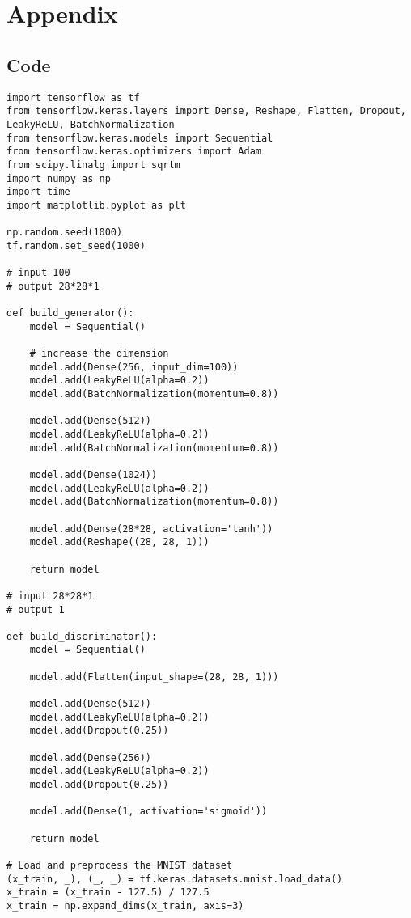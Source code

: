 \chapter{Appendix}
\label{Code}
\section*{Code}

\begin{lstlisting}[style=mypython, caption=GAN Model with Dense Layers]
import tensorflow as tf
from tensorflow.keras.layers import Dense, Reshape, Flatten, Dropout, LeakyReLU, BatchNormalization
from tensorflow.keras.models import Sequential
from tensorflow.keras.optimizers import Adam
from scipy.linalg import sqrtm
import numpy as np
import time
import matplotlib.pyplot as plt

np.random.seed(1000)
tf.random.set_seed(1000)

# input 100
# output 28*28*1

def build_generator():
    model = Sequential()
    
    # increase the dimension
    model.add(Dense(256, input_dim=100))
    model.add(LeakyReLU(alpha=0.2))
    model.add(BatchNormalization(momentum=0.8))
    
    model.add(Dense(512))
    model.add(LeakyReLU(alpha=0.2))
    model.add(BatchNormalization(momentum=0.8))
    
    model.add(Dense(1024))
    model.add(LeakyReLU(alpha=0.2))
    model.add(BatchNormalization(momentum=0.8))
    
    model.add(Dense(28*28, activation='tanh'))
    model.add(Reshape((28, 28, 1)))

    return model

# input 28*28*1
# output 1

def build_discriminator():
    model = Sequential()
    
    model.add(Flatten(input_shape=(28, 28, 1)))
    
    model.add(Dense(512))
    model.add(LeakyReLU(alpha=0.2))
    model.add(Dropout(0.25))
    
    model.add(Dense(256))
    model.add(LeakyReLU(alpha=0.2))
    model.add(Dropout(0.25))
    
    model.add(Dense(1, activation='sigmoid'))

    return model

# Load and preprocess the MNIST dataset
(x_train, _), (_, _) = tf.keras.datasets.mnist.load_data()
x_train = (x_train - 127.5) / 127.5
x_train = np.expand_dims(x_train, axis=3)


\end{lstlisting}
